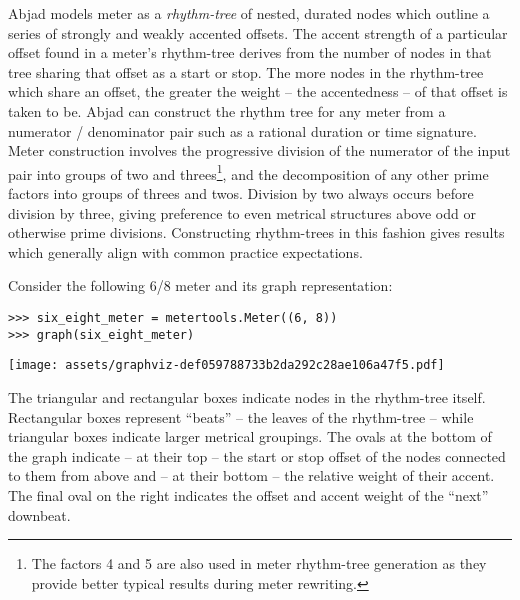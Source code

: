 Abjad models meter as a \emph{rhythm-tree} of nested, durated nodes which
outline a series of strongly and weakly accented offsets. The accent strength
of a particular offset found in a meter's rhythm-tree derives from the number
of nodes in that tree sharing that offset as a start or stop. The more nodes in
the rhythm-tree which share an offset, the greater the weight -- the
accentedness -- of that offset is taken to be. Abjad can construct the rhythm
tree for any meter from a numerator / denominator pair such as a rational
duration or time signature. Meter construction involves the progressive
division of the numerator of the input pair into groups of two and
threes\footnote{The factors 4 and 5 are also used in meter rhythm-tree
generation as they provide better typical results during meter rewriting.}, and
the decomposition of any other prime factors into groups of threes and twos.
Division by two always occurs before division by three, giving preference to
even metrical structures above odd or otherwise prime divisions. Constructing
rhythm-trees in this fashion gives results which generally align with common
practice expectations.

Consider the following 6/8 meter and its graph representation:

\begin{comment}
<abjad>
six_eight_meter = metertools.Meter((6, 8))
graph(six_eight_meter)
</abjad>
\end{comment}

\begin{abjadbookoutput}
\begin{singlespacing}
\vspace{-0.5\baselineskip}
\begin{verbatim}
>>> six_eight_meter = metertools.Meter((6, 8))
>>> graph(six_eight_meter)
\end{verbatim}
\noindent\texttt{[image: assets/graphviz-def059788733b2da292c28ae106a47f5.pdf]}
\end{singlespacing}
\end{abjadbookoutput}

\noindent The triangular and rectangular boxes indicate nodes in the
rhythm-tree itself. Rectangular boxes represent \enquote{beats} -- the leaves
of the rhythm-tree -- while triangular boxes indicate larger metrical
groupings. The ovals at the bottom of the graph indicate -- at their top -- the
start or stop offset of the nodes connected to them from above and -- at their
bottom -- the relative weight of their accent. The final oval on the right
indicates the offset and accent weight of the \enquote{next} downbeat.


